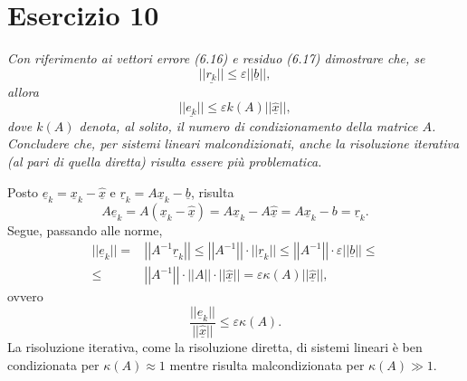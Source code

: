 \section{Esercizio 10}
\label{sub:es10}
\emph{Con riferimento ai vettori errore (6.16) e residuo (6.17) dimostrare che, se
			\begin{equation}
				\label{criterioArrestoSplitting}
				||\underline{r_k}||\leq\varepsilon||\underline{b}||,
			\end{equation}
			allora
			$$||\underline{e_k}||\leq\varepsilon k(A)||\underline{\hat{x}}||,$$
			dove $k(A)$ denota, al solito, il numero di condizionamento della matrice $A$.
      Concludere che, per sistemi lineari malcondizionati, anche la risoluzione iterativa (al pari di quella diretta)
      risulta essere più problematica.}
\begin{sol}
  Posto $\underline{e}_k=\underline{x}_k-\underline{\hat{x}}$
  e $\underline{r}_k=A\underline{x}_k-\underline{b}$, risulta
  $$A\underline{e}_k=A(\underline{x}_k-\underline{\hat{x}})=A\underline{x}_k-A\underline{\hat{x}}=A\underline{x}_k-b=\underline{r}_k.$$
  Segue, passando alle norme,
  \begin{equation}\begin{split}||\underline{e}_k||=&\left|\left|A^{-1}\underline{r}_k\right|\right|\leq\left|\left|A^{-1}\right|\right|\cdot||\underline{r}_k||\leq\left|\left|A^{-1}\right|\right|\cdot\varepsilon||\underline{b}||\leq\\\leq&\left|\left|A^{-1}\right|\right|\cdot\left|\left|A\right|\right|\cdot||\underline{\hat{x}}||=\varepsilon\kappa(A)||\underline{\hat{x}}||,\end{split}\end{equation}
  ovvero $$\frac{||\underline{e}_k||}{||\underline{\hat{x}}||}\leq\varepsilon\kappa(A).$$
  La risoluzione iterativa, come la risoluzione diretta, di sistemi lineari è ben condizionata per
  $\kappa(A)\approx 1$ mentre risulta malcondizionata per $\kappa(A)\gg 1$.
\end{sol}


